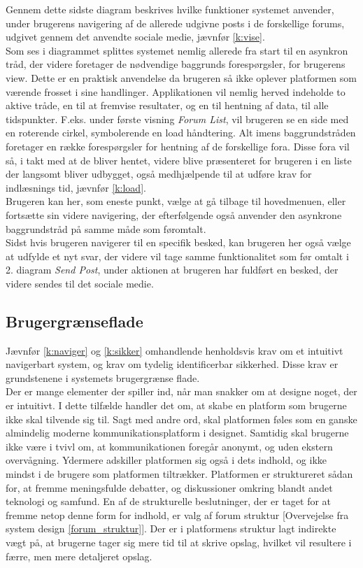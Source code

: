 Gennem dette sidste diagram beskrives hvilke funktioner systemet anvender, under brugerens navigering af de allerede udgivne posts i de forskellige forums, udgivet gennem det anvendte sociale medie, jævnfør \ref{k:vise}.\\
Som ses i diagrammet splittes systemet nemlig allerede fra start til en asynkron tråd, der videre foretager de nødvendige baggrunds forespørgsler, for brugerens view. Dette er en praktisk anvendelse da brugeren så ikke oplever platformen som værende frosset i sine handlinger. Applikationen vil nemlig herved indeholde to aktive tråde, en til at fremvise resultater, og en til hentning af data, til alle tidspunkter.
F.eks. under første visning \textit{Forum List}, vil brugeren se en side med en roterende cirkel, symbolerende en load håndtering. Alt imens baggrundstråden foretager en række forespørgsler for hentning af de forskellige fora. Disse fora vil så, i takt med at de bliver hentet, videre blive præsenteret for brugeren i en liste der langsomt bliver udbygget, også medhjælpende til at udføre krav for indlæsnings tid, jævnfør \ref{k:load}.\\
Brugeren kan her, som eneste punkt, vælge at gå tilbage til hovedmenuen, eller fortsætte sin videre navigering, der efterfølgende også anvender den asynkrone baggrundstråd på samme måde som føromtalt.\\
Sidst hvis brugeren navigerer til en specifik besked, kan brugeren her også vælge at udfylde et nyt svar, der videre vil tage samme funktionalitet som før omtalt i 2. diagram \textit{Send Post}, under aktionen at brugeren har fuldført en besked, der videre sendes til det sociale medie.

\subsection{Brugergrænseflade}
\label{brugerflade}
Jævnfør \ref{k:naviger} og \ref{k:sikker} omhandlende henholdsvis krav om et intuitivt navigerbart system, og krav om tydelig identificerbar sikkerhed. Disse krav er grundstenene i systemets brugergrænse flade.\\
Der er mange elementer der spiller ind, når man snakker om at designe noget, der er intuitivt. I dette tilfælde handler det om, at skabe en platform som brugerne ikke skal tilvende sig til. Sagt med andre ord, skal platformen føles som en ganske almindelig moderne kommunikationsplatform i designet. Samtidig skal brugerne ikke være i tvivl om, at kommunikationen foregår anonymt, og uden ekstern overvågning. Ydermere adskiller platformen sig også i dets indhold, og ikke mindst i de brugere som platformen tiltrækker. Platformen er struktureret sådan for, at fremme meningsfulde debatter, og diskussioner omkring blandt andet teknologi og samfund. En af de strukturelle beslutninger, der er taget for at fremme netop denne form for indhold, er valg af forum struktur [Overvejelse fra system design \ref{forum_struktur}]. Der er i platformens struktur lagt indirekte vægt på, at brugerne tager sig mere tid til at skrive opslag, hvilket vil resultere i færre, men mere detaljeret opslag.

